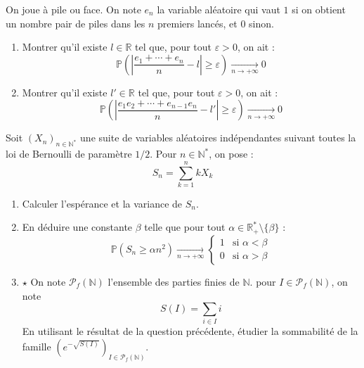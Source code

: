 \documentclass[french,a4paper]{article}
\renewcommand{\P}{\mathbb{P}}
\newcommand{\N}{\mathbb{N}}
\newcommand{\R}{\mathbb{R}}
\newcommand{\st}{^*}
\theoremstyle{plain}
\theoremstyle{definition}
\theoremstyle{remark}
\begin{document}
\begin{ex}[Moulin.83]{}
	On joue à pile ou face. On note $e_n$ la variable aléatoire qui vaut $1$ si on obtient un nombre pair de piles dans les $n$ premiers lancés, et $0$ sinon.
	\begin{enumerate}
		\item Montrer qu'il existe $l\in\R$ tel que, pour tout $\varepsilon>0$, on ait : $$\P\left(\left\lvert\frac{e_1+\cdots+e_n}{n}-l\right\rvert\geqslant\varepsilon\right)\xrightarrow[n\to+\infty]{}0$$
		\item Montrer qu'il existe $l'\in\R$ tel que, pour tout $\varepsilon>0$, on ait : $$\P\left(\left\lvert\frac{e_1e_2+\cdots+e_{n-1}e_n}{n}-l'\right\rvert\geqslant\varepsilon\right)\xrightarrow[n\to+\infty]{}0$$
	\end{enumerate}
\end{ex}

\begin{ex}[Moulin.84]{}
	Soit $(X_n)_{n\in\N\st}$ une suite de variables aléatoires indépendantes suivant toutes la loi de Bernoulli de paramètre $1/2$. Pour $n\in\N\st$, on pose : $$S_n=\sum_{k=1}^{n}kX_k$$
	\begin{enumerate}
		\item Calculer l'espérance et la variance de $S_n$.
		\item En déduire une constante $\beta$ telle que pour tout $\alpha\in\R_+\st\setminus\{\beta\}$ : $$\P(S_n\geqslant\alpha n^2)\xrightarrow[n\to+\infty]{}\begin{cases}
			1&\text{si }\alpha<\beta\\
			0&\text{si }\alpha>\beta
		\end{cases}$$
		\item $\star$ On note $\mathcal{P}_f(\N)$ l'ensemble des parties finies de $\N$. pour $I\in\mathcal{P}_f(\N)$, on note $$S(I)=\sum_{i\in I}i$$ En utilisant le résultat de la question précédente, étudier la sommabilité de la famille $\displaystyle\left(e^{-\sqrt{S(I)}}\right)_{I\in\mathcal{P}_f(\N)}$.
	\end{enumerate}
\end{ex}
\end{document}
